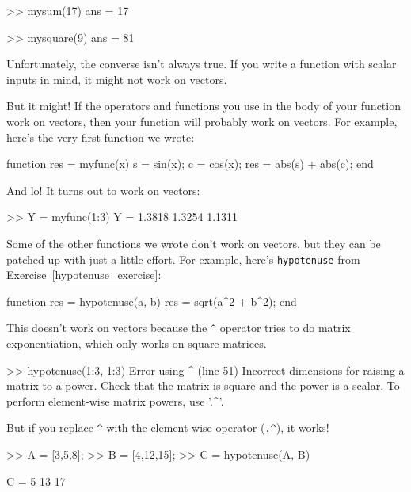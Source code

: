 
\begin{code}
>> mysum(17)
ans = 17

>> mysquare(9)
ans = 81
\end{code}

Unfortunately, the converse isn't always true.  If you write
a function with scalar inputs in mind, it might not work on vectors.

But it might!  If the operators and functions
you use in the body of your function work on vectors, then your
function will probably work on vectors.
For example, here's the very first function we wrote:

\begin{code}
function res = myfunc(x)
    s = sin(x);
    c = cos(x);
    res = abs(s) + abs(c);
end
\end{code}

And lo!  It turns out to work on vectors:

\begin{code}
>> Y = myfunc(1:3)
Y = 1.3818    1.3254    1.1311
\end{code}

Some of the other functions we wrote don't work on vectors,
but they can be patched up with just a little effort.  For example,
here's \lstinline{hypotenuse} from Exercise~\ref{hypotenuse_exercise}:

\begin{code}
function res = hypotenuse(a, b)
    res = sqrt(a^2 + b^2);
end
\end{code}

This doesn't work on vectors because the \lstinline{^} operator
tries to do matrix exponentiation, which only works on
square matrices.


\begin{code}
>> hypotenuse(1:3, 1:3)
Error using  ^  (line 51)
Incorrect dimensions for raising a matrix to a power.
Check that the matrix is square and the power is a scalar.
To perform element-wise matrix powers, use '.^'.
\end{code}

But if you replace \lstinline{^} with the element-wise operator
(\lstinline{.^}), it works!


\begin{code}
>> A = [3,5,8];
>> B = [4,12,15];
>> C = hypotenuse(A, B)

C = 5    13    17
\end{code}

